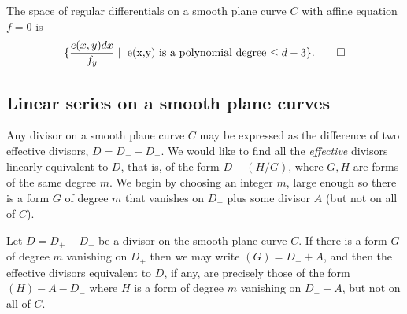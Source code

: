 \begin{theorem}
The space of regular differentials on a smooth plane curve $C$
with affine equation $f=0$ is 
$$
\{ \frac{e(x,y)dx}{f_{y}} \mid \hbox{ e(x,y) is a polynomial degree $\leq d-3$}\}.\qed
 $$
\end{theorem}
%
%

\subsection{Linear series on a smooth plane curves}\label{linear series on smooth plane curves}

Any divisor on a smooth plane curve $C$ may be expressed as the difference of
two effective divisors, $D= D_{+}-D_{-}$. We would like to find all the \emph{effective} divisors linearly equivalent to $D$, that is, of the form
$D + (H/G)$, where $G, H$ are forms of the same degree $m$. We begin by choosing
an integer $m$, large enough so there is a form $G$ of degree $m$ that vanishes on $D_{+}$ plus some divisor $A$ (but not on all of $C$). 

\begin{theorem}\label{equiv on smooth plane curve}
Let $D= D_{+}-D_{-}$ be a divisor on the smooth plane curve $C$. If
there is a form $G$ of degree $m$ vanishing on $D_{+}$
then we may write $(G) = D_{+}+A$, and then
the effective divisors equivalent to $D$, if any, are precisely those 
of the form $(H) - A -D_{-}$ where $H$
is a form of degree $m$ vanishing on $D_{-}+A$, but not on all of $C$.
\end{theorem}

